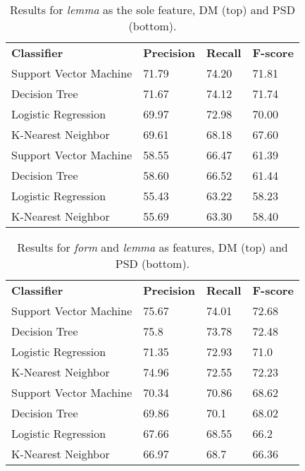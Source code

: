 \begin{table}
    \centering
    \smaller[0.2]
    \begin{tabular}{@{}llll@{}}
        \toprule
        \textbf{Classifier} & \textbf{Precision} & \textbf{Recall} & \textbf{F-score} \\
        Support Vector Machine & 71.79    & 74.20    & 71.81  \\
        Decision Tree & 71.67  & 74.12    & 71.74 \\
        Logistic Regression & 69.97    & 72.98    & 70.00 \\
        K-Nearest Neighbor & 69.61    & 68.18    & 67.60 \\
        \midrule
        Support Vector Machine & 58.55    & 66.47    & 61.39 \\
        Decision Tree & 58.60 &  66.52    & 61.44 \\
        Logistic Regression  & 55.43    & 63.22    & 58.23 \\
        K-Nearest Neighbor & 55.69    & 63.30    & 58.40 \\
        \bottomrule
    \end{tabular}
    \caption{Results for \textit{lemma} as the sole feature, DM (top) and PSD (bottom).}
    \label{table:lemma}
\end{table}

\begin{table}
    \centering
    \smaller[0.2]
    \begin{tabular}{@{}llll@{}}
        \toprule
        \textbf{Classifier} & \textbf{Precision} & \textbf{Recall} & \textbf{F-score} \\
        Support Vector Machine & 75.67 & 74.01 & 72.68 \\
        Decision Tree & 75.8 & 73.78 & 72.48 \\
        Logistic Regression & 71.35 & 72.93 & 71.0 \\
        K-Nearest Neighbor & 74.96 & 72.55 & 72.23 \\
        \midrule
        Support Vector Machine & 70.34 & 70.86 & 68.62 \\
        Decision Tree & 69.86 & 70.1 & 68.02 \\
        Logistic Regression  & 67.66 & 68.55 & 66.2 \\
        K-Nearest Neighbor & 66.97 & 68.7 & 66.36 \\
        \bottomrule
    \end{tabular}
    \caption{Results for \textit{form} and \textit{lemma} as features, DM (top) and PSD (bottom).}
    \label{table:form_lemma}
\end{table}

